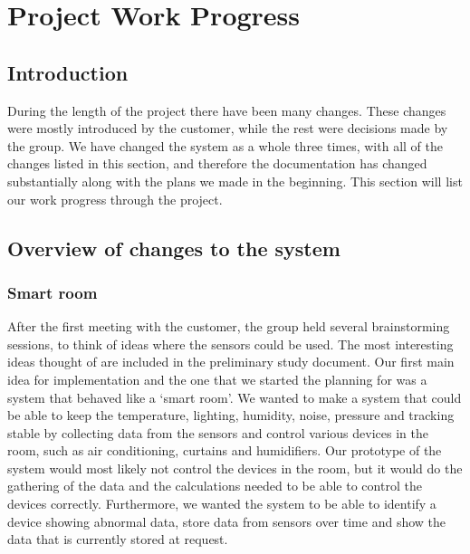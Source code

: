 \documentclass[../document.tex]{subfiles}
\begin{document}
\section{Project Work Progress}

\subsection{Introduction}
During the length of the project there have been many changes. These changes were mostly introduced by the customer, while the rest were decisions made by the group. We have changed the system as a whole three times, with all of the changes listed in this section, and therefore the documentation has changed substantially along with the plans we made in the beginning. This section will list our work progress through the project.

\subsection{Overview of changes to the system}
\subsubsection{Smart room}
After the first meeting with the customer, the group held several brainstorming sessions, to think of ideas where the sensors could be used. The most interesting ideas thought of are included in the preliminary study document. Our first main idea for implementation and the one that we started the planning for was a system that behaved like a ‘smart room’. We wanted to make a system that could be able to keep the temperature, lighting, humidity, noise, pressure and tracking stable by collecting data from the sensors and control various devices in the room, such as air conditioning, curtains and humidifiers. Our prototype of the system would most likely not control the devices in the room, but it would do the gathering of the data and the calculations needed to be able to control the devices correctly. Furthermore, we wanted the system to be able to identify a device showing abnormal data, store data from sensors over time and show the data that is currently stored at request.
\end{document}
